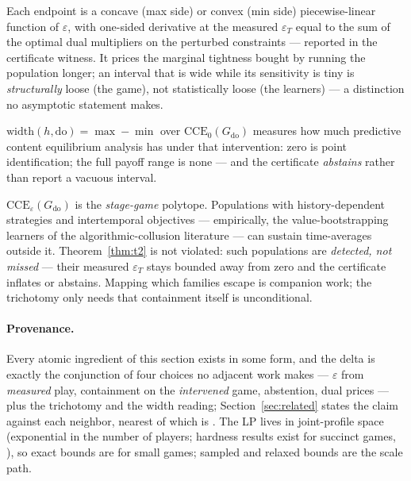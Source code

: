 \documentclass[pmlr]{jmlr}
\newcommand{\doop}{\mathrm{do}}
\newcommand{\CCE}{\mathrm{CCE}}
\begin{document}
\begin{corollary}\label{cor:duals}
Each endpoint is a concave (max side) or convex (min side) piecewise-linear function of
$\varepsilon$, with one-sided derivative at the measured $\varepsilon_T$ equal to the sum of the
optimal dual multipliers on the perturbed constraints --- reported in the certificate witness.
It prices the marginal tightness bought by running the population longer; an interval that is
wide while its sensitivity is tiny is \emph{structurally} loose (the game), not statistically
loose (the learners) --- a distinction no asymptotic statement makes.
\end{corollary}

\begin{remark}\label{rem:width}
$\mathrm{width}(h, \doop) = \max - \min$ over $\CCE_0(G_{\doop})$ measures how much predictive
content equilibrium analysis has under that intervention: zero is point identification; the
full payoff range is none --- and the certificate \emph{abstains} rather than report a vacuous
interval.
\end{remark}

\begin{remark}\label{rem:scope}
$\CCE_{\varepsilon}(G_{\doop})$ is the \emph{stage-game} polytope. Populations with
history-dependent strategies and intertemporal objectives --- empirically, the
value-bootstrapping learners of the algorithmic-collusion literature
\citep{calvano2020artificial} --- can sustain time-averages outside it. Theorem~\ref{thm:t2} is
not violated: such populations are \emph{detected, not missed} --- their measured
$\varepsilon_T$ stays bounded away from zero and the certificate inflates or abstains. Mapping
which families escape is companion work; the trichotomy only needs that containment itself is
unconditional.
\end{remark}

\paragraph{Provenance.} Every atomic ingredient of this section exists in some form, and the
delta is exactly the conjunction of four choices no adjacent work makes --- $\varepsilon$ from
\emph{measured} play, containment on the \emph{intervened} game, abstention, dual prices ---
plus the trichotomy and the width reading; Section~\ref{sec:related} states the claim against
each neighbor, nearest of which is \citet{lomys2025estimation}. The LP lives in joint-profile
space (exponential in the number of players; hardness results exist for succinct games,
\citealp{papadimitriou2008computing}), so exact bounds are for small games; sampled and relaxed
bounds are the scale path.
\end{document}
